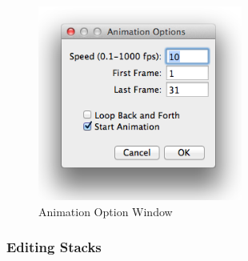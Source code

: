 \begin{indentexercise}{2}
\begin{figure}[hbtp]
\begin{center}
\includegraphics[width=0.6\textwidth]{fig/animationOptions.png}
\caption{ Animation Option Window}
\label{fig:img131}
\end{center}
\end{figure}
\end{indentexercise}

\subsubsection{Editing Stacks}

